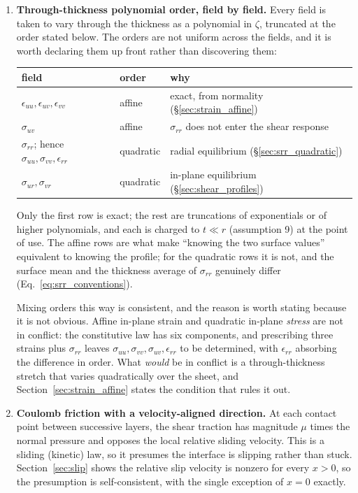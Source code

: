 \documentclass[11pt]{article}
\begin{document}
\begin{enumerate}
\item \textbf{Through-thickness polynomial order, field by field.} Every field is
  taken to vary through the thickness as a polynomial in $\zeta$, truncated at the
  order stated below. The orders are not uniform across the fields, and it is
  worth declaring them up front rather than discovering them:
  \begin{center}
  \begin{tabular}{@{}lll@{}}
  \toprule
  field & order & why\\
  \midrule
  $\epsilon_{uu}, \epsilon_{uv}, \epsilon_{vv}$ & affine
    & exact, from normality (\S\ref{sec:strain_affine})\\
  $\sigma_{uv}$ & affine
    & $\sigma_{rr}$ does not enter the shear response\\
  $\sigma_{rr}$; hence $\sigma_{uu}, \sigma_{vv}, \epsilon_{rr}$ & quadratic
    & radial equilibrium (\S\ref{sec:srr_quadratic})\\
  $\sigma_{ur}, \sigma_{vr}$ & quadratic
    & in-plane equilibrium (\S\ref{sec:shear_profiles})\\
  \bottomrule
  \end{tabular}
  \end{center}
  Only the first row is exact; the rest are truncations of exponentials or of
  higher polynomials, and each is charged to $t \ll r$ (assumption 9) at the point
  of use. The affine rows are what make ``knowing the two surface values'' equivalent
  to knowing the profile; for the quadratic rows it is not, and the surface mean and
  the thickness average of $\sigma_{rr}$ genuinely differ
  (Eq.~\ref{eq:srr_conventions}).

  Mixing orders this way is consistent, and the reason is worth stating because it
  is not obvious. Affine in-plane strain and quadratic in-plane \emph{stress} are
  not in conflict: the constitutive law has six components, and prescribing three
  strains plus $\sigma_{rr}$ leaves $\sigma_{uu}, \sigma_{vv}, \sigma_{uv},
  \epsilon_{rr}$ to be determined, with $\epsilon_{rr}$ absorbing the difference in
  order. What \emph{would} be in conflict is a through-thickness stretch that varies
  quadratically over the sheet, and Section~\ref{sec:strain_affine} states the
  condition that rules it out.

\item \textbf{Coulomb friction with a velocity-aligned direction.} 
At each contact point between successive layers, the shear traction has magnitude $\mu$ times the normal pressure and opposes the
  local relative sliding velocity. This is a sliding (kinetic) law, so it presumes
  the interface is slipping rather than stuck. Section~\ref{sec:slip} shows the
  relative slip velocity is nonzero for every $x > 0$, so the presumption is
  self-consistent, with the single exception of $x = 0$ exactly.


\end{enumerate}
\end{document}
